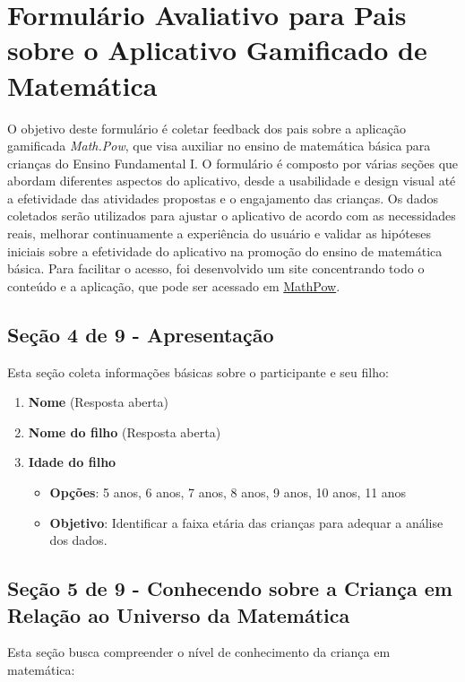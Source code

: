 \section{Formulário Avaliativo para Pais sobre o Aplicativo Gamificado de Matemática}

O objetivo deste formulário é coletar feedback dos pais sobre a aplicação gamificada \textit{Math.Pow}, que visa auxiliar no ensino de matemática básica para crianças do Ensino Fundamental I. O formulário é composto por várias seções que abordam diferentes aspectos do aplicativo, desde a usabilidade e design visual até a efetividade das atividades propostas e o engajamento das crianças. Os dados coletados serão utilizados para ajustar o aplicativo de acordo com as necessidades reais, melhorar continuamente a experiência do usuário e validar as hipóteses iniciais sobre a efetividade do aplicativo na promoção do ensino de matemática básica. Para facilitar o acesso, foi desenvolvido um site concentrando todo o conteúdo e a aplicação, que pode ser acessado em \href{https://mathpow.vercel.app/}{MathPow}.

\subsection{Seção 4 de 9 - Apresentação}

Esta seção coleta informações básicas sobre o participante e seu filho:

\begin{enumerate}
    \item \textbf{Nome} (Resposta aberta)
    \item \textbf{Nome do filho} (Resposta aberta)
    \item \textbf{Idade do filho}
    \begin{itemize}
        \item \textbf{Opções}: 5 anos, 6 anos, 7 anos, 8 anos, 9 anos, 10 anos, 11 anos
        \item \textbf{Objetivo}: Identificar a faixa etária das crianças para adequar a análise dos dados.
    \end{itemize}
\end{enumerate}

\subsection{Seção 5 de 9 - Conhecendo sobre a Criança em Relação ao Universo da Matemática}

Esta seção busca compreender o nível de conhecimento da criança em matemática:

